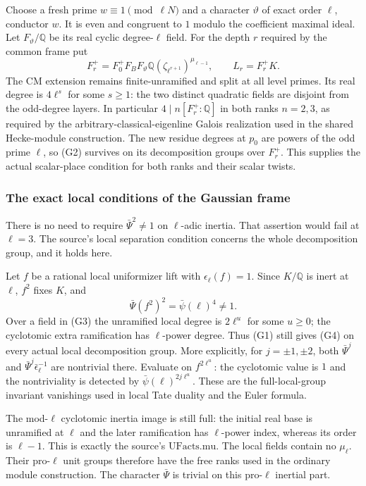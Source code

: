 Choose a fresh prime
\(w\equiv1\pmod{\ell N}\) and a character \(\vartheta\)
of exact order \(\ell\), conductor \(w\).
It is even and congruent to \(1\) modulo the coefficient
maximal ideal.
Let \(F_\vartheta/\mathbb Q\) be its real cyclic
degree-\(\ell\) field.
For the depth \(r\) required by the common frame put
\[
 F_r^+=F_0^+F_BF_\vartheta
        \mathbb Q(\zeta_{\ell^{r+1}})^{\mu_{\ell-1}},
                  \qquad L_r=F_r^+K .
 \tag{G3}
\]
The CM extension remains finite-unramified and split
at all level primes.
Its real degree is \(4\ell^s\) for some \(s\ge1\):
the two distinct quadratic fields are disjoint from the
odd-degree layers.
In particular \(4\mid n[F_r^+:\mathbb Q]\) in both
ranks \(n=2,3\), as required by the arbitrary-classical-eigenline
Galois realization used in the shared Hecke-module construction.
The new residue degrees at \(p_0\) are powers of the
odd prime \(\ell\), so (G2) survives on its decomposition
groups over \(F_r^+\).
This supplies the actual scalar-place condition for
both ranks and their scalar twists.

\subsubsection{The exact local conditions of the Gaussian frame}
There is no need to require
\(\bar\Psi^2\ne1\) on \(\ell\)-adic inertia.
That assertion would fail at \(\ell=3\).
The source's local separation condition concerns the
whole decomposition group, and it holds here.

Let \(f\) be a rational local uniformizer lift with
\(\epsilon_\ell(f)=1\).
Since \(K/\mathbb Q\) is inert at \(\ell\), \(f^2\)
fixes \(K\), and
\[
                 \bar\Psi(f^2)^2=\bar\psi(\ell)^4\ne1 .
 \tag{G4}
\]
Over a field in (G3) the unramified local degree is
\(2\ell^u\) for some \(u\ge0\);
the cyclotomic extra ramification has \(\ell\)-power degree.
Thus (G1) still gives (G4) on every actual local
decomposition group.
More explicitly, for \(j=\pm1,\pm2\), both
\(\bar\Psi^j\) and
\(\bar\Psi^j\bar\epsilon_\ell^{-1}\)
are nontrivial there.
Evaluate on \(f^{2\ell^u}\):
the cyclotomic value is \(1\) and the nontriviality
is detected by \(\bar\psi(\ell)^{2j\ell^u}\).
These are the full-local-group invariant vanishings
used in local Tate duality and the Euler formula.

The mod-\(\ell\) cyclotomic inertia image is still full:
the initial real base is unramified at \(\ell\) and
the later ramification has \(\ell\)-power index,
whereas its order is \(\ell-1\).
This is exactly the source's \(\mathrm{UFacts.mu}\).
The local fields contain no \(\mu_\ell\).
Their pro-\(\ell\) unit groups therefore have the
free ranks used in the ordinary module construction.
The character \(\bar\Psi\) is trivial on this pro-\(\ell\)
inertial part.

